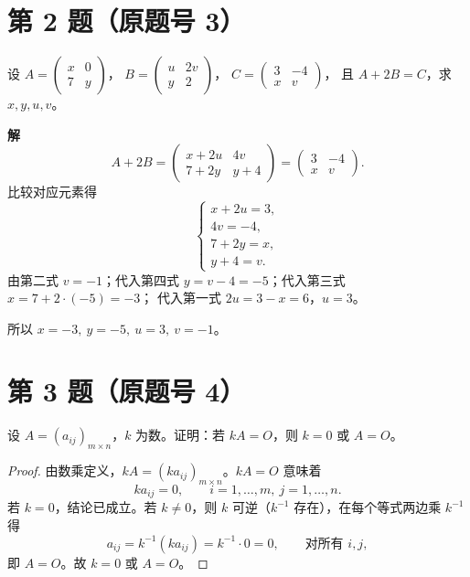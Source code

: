 \documentclass[11pt,a4paper]{ctexart}
\newenvironment{problem}[1]
  {\par\medskip\noindent\textbf{#1}\quad}
  {\par}
\newenvironment{solution}
  {\par\noindent\textbf{解}\quad}
  {\par}
\begin{document}
\section*{第 2 题（原题号 3）}

\begin{problem}{}设
$A=\begin{pmatrix}x&0\\7&y\end{pmatrix}$，
$B=\begin{pmatrix}u&2v\\y&2\end{pmatrix}$，
$C=\begin{pmatrix}3&-4\\x&v\end{pmatrix}$，
且 $A+2B=C$，求 $x,y,u,v$。
\end{problem}

\begin{solution}
\[
A+2B=\begin{pmatrix}x+2u&4v\\7+2y&y+4\end{pmatrix}
=\begin{pmatrix}3&-4\\x&v\end{pmatrix}.
\]
比较对应元素得
\[
\begin{cases}
x+2u=3,\\ 4v=-4,\\ 7+2y=x,\\ y+4=v.
\end{cases}
\]
由第二式 $v=-1$；代入第四式 $y=v-4=-5$；代入第三式 $x=7+2\cdot(-5)=-3$；
代入第一式 $2u=3-x=6$，$u=3$。

所以 $x=-3,\ y=-5,\ u=3,\ v=-1$。
\end{solution}

\section*{第 3 题（原题号 4）}

\begin{problem}{}设 $A=(a_{ij})_{m\times n}$，$k$ 为数。证明：若 $kA=O$，则 $k=0$ 或 $A=O$。\end{problem}

\begin{proof}
由数乘定义，$kA=(ka_{ij})_{m\times n}$。$kA=O$ 意味着
\[
ka_{ij}=0,\qquad i=1,\dots,m,\ j=1,\dots,n.
\]
若 $k=0$，结论已成立。若 $k\neq0$，则 $k$ 可逆（$k^{-1}$ 存在），在每个等式两边乘 $k^{-1}$ 得
\[
a_{ij}=k^{-1}(ka_{ij})=k^{-1}\cdot0=0,\qquad \text{对所有 } i,j,
\]
即 $A=O$。故 $k=0$ 或 $A=O$。
\end{proof}
\end{document}
